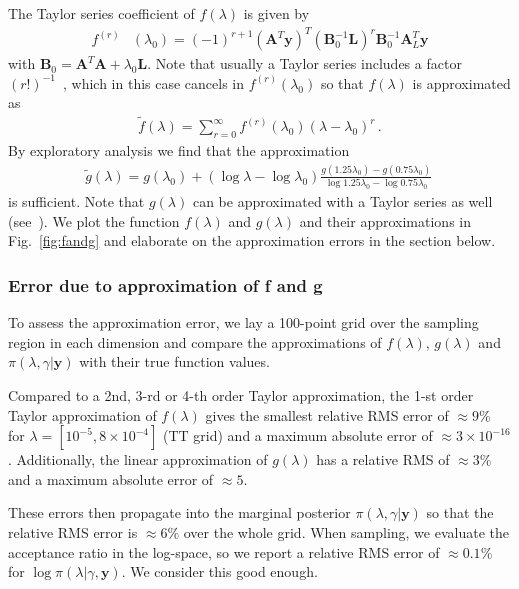 The Taylor series coefficient of $f(\lambda)$ is given by
\begin{align}
	f^{(r)}& (\lambda_0)= (-1)^{r+1} (\bm{A}^T \bm{y})^T (\bm{B}_0^{-1} \bm{L})^r \bm{B}_0^{-1} \bm{A}_L^T \bm{y} \label{eq:ftay} 
\end{align} 
with $\bm{B}_0 = \bm{A}^T  \bm{A} + \lambda_0 \bm{L}$.
Note that usually a Taylor series includes a factor $(r!)^{-1}$~\cite{fox2016fast}, which in this case cancels in $f^{(r)}(\lambda_0)$ so that $f(\lambda)$ is approximated as 
\begin{align}
		\tilde{f} ( \lambda) = \sum^{\infty}_{r=0} 	f^{(r)}(\lambda_0) (\lambda-\lambda_0)^r  \label{eq:fAprox} \, . 
\end{align}
By exploratory analysis we find that the approximation
\begin{align}
 \tilde{g}(\lambda)=  g(\lambda_{0}) + (\log{\lambda} - \log{\lambda_{0}})  \frac{ g(1.25\lambda_{0}) - g(0.75\lambda_{0}) }{\log{1.25\lambda_{0}} - \log{0.75\lambda_{0}} }  \label{eq:gAprox} \, 
\end{align}
is sufficient.
Note that $g(\lambda)$ can be approximated with a Taylor series as well (see~\cite{fox2016fast}).
We plot the function $f(\lambda)$ and $g(\lambda)$ and their approximations in Fig.~\ref{fig:fandg} and elaborate on the approximation errors in the section below.

\subsubsection{Error due to approximation of f and g}
To assess the approximation error, we lay a 100-point grid over the sampling region in each dimension and compare the approximations of $f(\lambda)$, $g(\lambda)$ and $\pi(\lambda, \gamma | \bm{y})$ with their true function values.

Compared to a 2nd, 3-rd or 4-th order Taylor approximation, the 1-st order Taylor approximation of $f(\lambda)$ gives the smallest relative RMS error of $\approx 9 \%$ for $\lambda = [ 10^{-5}, 8 \times 10^{-4}]$ (TT grid) and a maximum absolute error of $\approx 3 \times 10^{-16}$.
Additionally, the linear approximation of $g(\lambda)$ has a relative RMS of $\approx 3\%$ and a maximum absolute error of $\approx 5$.

These errors then propagate into the marginal posterior $\pi(\lambda , \gamma| \bm{y})$ so that the relative RMS error is $\approx 6 \%$ over the whole grid.
When sampling, we evaluate the acceptance ratio in the log-space, so we report a relative RMS error of $ \approx0.1\%$ for $\log{\pi(\lambda| \gamma, \bm{y})}$.
We consider this good enough.




